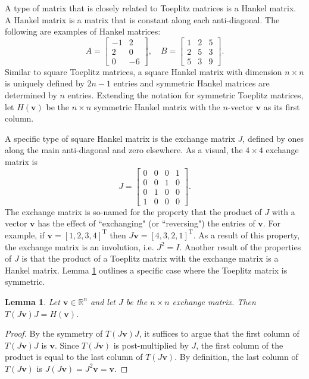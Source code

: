 \documentclass[12pt,notitlepage]{report}
\newcommand{\trans}{\mathrm{T}}	%
\newtheorem{lemma}{Lemma}[section]
\begin{document}
A type of matrix that is closely related to Toeplitz matrices is a Hankel matrix. A Hankel matrix is a matrix that is constant along each anti-diagonal. The following are examples of Hankel matrices:
\[A = \begin{bmatrix}
-1 & 2 \\
2 & 0 \\
0 & -6
\end{bmatrix}, \quad 
B = \begin{bmatrix}
1 & 2 & 5 \\
2 & 5 & 3 \\
5 & 3 & 9
\end{bmatrix}.\]
Similar to square Toeplitz matrices, a square Hankel matrix with dimension $n \times n$ is uniquely defined by $2n -1$ entries and symmetric Hankel matrices are determined by $n$ entries. Extending the notation for symmetric Toeplitz matrices, let $H(\mathbf{v})$ be the $n \times n$ symmetric Hankel matrix with the $n$-vector $\mathbf{v}$ as its first column. \par
A specific type of square Hankel matrix is the exchange matrix $J$, defined by ones along the main anti-diagonal and zero elsewhere. As a visual, the $4 \times 4$ exchange matrix is
\[J = \begin{bmatrix}
0 & 0 & 0 & 1 \\
0 & 0 & 1 & 0 \\
0 & 1 & 0 & 0 \\
1 & 0  & 0 & 0
\end{bmatrix}.\]
The exchange matrix is so-named for the property that the product of $J$ with a vector $\mathbf{v}$ has the effect of ``exchanging" (or ``reversing") the entries of $\mathbf{v}$. For example, if $\mathbf{v} = [1,2,3,4]^\trans$ then $J\mathbf{v} = [4,3,2,1]^\trans$. As a result of this property, the exchange matrix is an involution, i.e. $J^2 = I$. Another result of the properties of $J$ is that the product of a Toeplitz matrix with the exchange matrix is a Hankel matrix. Lemma \ref{lem:TJ = H} outlines a specific case where the Toeplitz matrix is symmetric.
\begin{lemma}
\label{lem:TJ = H}
Let $\mathbf{v} \in \mathbb{R}^n$ and let $J$ be the $n \times n$ exchange matrix. Then $T(J\mathbf{v})J = H(\mathbf{v})$.
\end{lemma}
\begin{proof}
By the symmetry of $T(J\mathbf{v})J$, it suffices to argue that the first column of $T(J\mathbf{v})J$ is $\mathbf{v}$. Since $T(J\mathbf{v})$ is post-multiplied by $J$, the first column of the product is equal to the last column of $T(J\mathbf{v})$. By definition, the last column of $T(J\mathbf{v})$ is $J(J\mathbf{v}) = J^2\mathbf{v} = \mathbf{v}$.
\end{proof}
\end{document}
